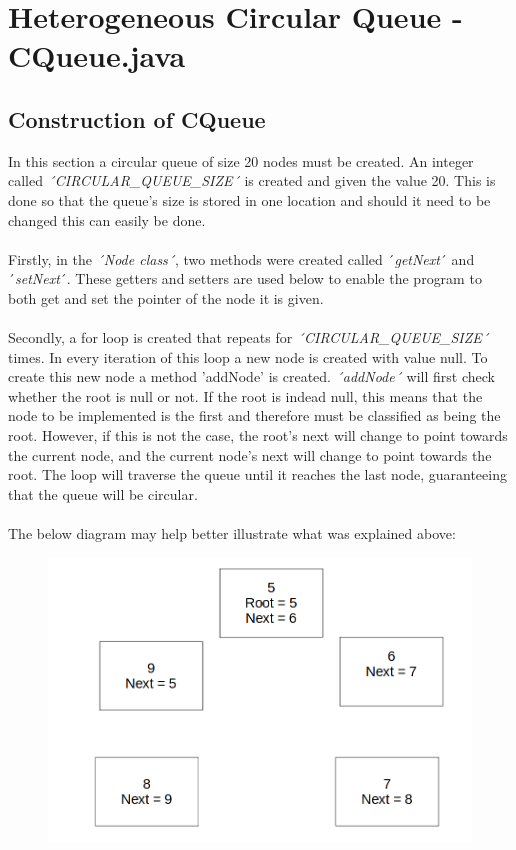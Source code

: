 \documentclass[12pt]{article}
\begin{document}
\newpage
\section{Heterogeneous Circular Queue - CQueue.java}
\bigskip

\subsection{Construction of CQueue}
In this section a circular queue of size 20 nodes must be created. An integer called \emph{´CIRCULAR\_QUEUE\_SIZE´} is created and given the value 20. This is done so that the queue's size is stored in one location and should it need to be changed this can easily be done. \\
\\Firstly, in the \emph{´Node class´}, two methods were created called ´\emph{getNext}´ and ´\emph{setNext}´. These getters and setters are used below to enable the program to both get and set the pointer of the node it is given.\\
\\Secondly, a for loop is created that repeats for \emph{´CIRCULAR\_QUEUE\_SIZE´} times. In every iteration of this loop a new node is created with value null. To create this new node a method 'addNode' is created. \emph{´addNode´} will first check whether the root is null or not. If the root is indead null, this means that the node to be implemented is the first and therefore must be classified as being the root. However, if this is not the case, the root's next will change to point towards the current node, and the current node's next will change to point towards the root. The loop will traverse the queue until it reaches the last node, guaranteeing that the queue will be circular.\\
\\The below diagram may help better illustrate what was explained above:
\begin{figure}[h]
\centering
\includegraphics[scale=0.30]{Images/Insert.png}
\end{figure}
\bigskip
\end{document}
